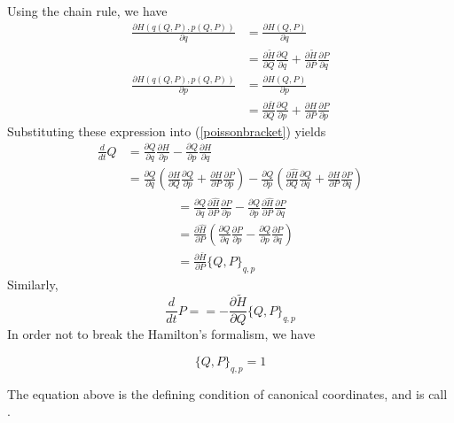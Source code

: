 Using the chain rule, we have
$$
\begin{aligned}
\frac{\partial H(q(Q, P), p(Q, P))}{\partial q} & = \frac{\partial H(Q, P)}{\partial q} \\
&=\frac{\partial \tilde{H}}{\partial Q} \frac{\partial Q}{\partial q}+\frac{\partial \tilde{H}}{\partial P} \frac{\partial P}{\partial q}
\end{aligned}
$$
$$
\begin{aligned}
\frac{\partial H(q(Q, P), p(Q, P))}{\partial p} & = \frac{\partial H(Q, P)}{\partial p} \\
&=\frac{\partial \bar{H}}{\partial Q} \frac{\partial Q}{\partial p}+\frac{\partial H}{\partial P} \frac{\partial P}{\partial p}
\end{aligned}
$$
Substituting these expression into (\ref{poissonbracket}) yields
$$
\begin{aligned}
\frac{d}{d t} Q &=\frac{\partial Q}{\partial q} \frac{\partial H}{\partial p}-\frac{\partial Q}{\partial p} \frac{\partial H}{\partial q} \\
&=\frac{\partial Q}{\partial q}\left(\frac{\partial H}{\partial Q} \frac{\partial Q}{\partial p}+\frac{\partial H}{\partial P} \frac{\partial P}{\partial p}\right)-\frac{\partial Q}{\partial p}\left(\frac{\partial \hat{H}}{\partial Q} \frac{\partial Q}{\partial q}+\frac{\partial H}{\partial P} \frac{\partial P}{\partial q}\right)
\end{aligned}
$$
$$
\begin{aligned}
&=\frac{\partial Q}{\partial q} \frac{\partial \hat{H}}{\partial P} \frac{\partial P}{\partial p}-\frac{\partial Q}{\partial p} \frac{\partial \hat{H}}{\partial P} \frac{\partial P}{\partial q}\\
&=\frac{\partial \hat{H}}{\partial P}\left(\frac{\partial Q}{\partial q} \frac{\partial P}{\partial p}-\frac{\partial Q}{\partial p} \frac{\partial P}{\partial q}\right)\\
&=\frac{\partial \bar{H}}{\partial P}\{Q, P\}_{q, p}
\end{aligned}
$$
Similarly,
$$
\frac{d}{d t} P==-\frac{\partial \tilde{H}}{\partial Q}\{Q, P\}_{q, p}
$$
In order not to break the Hamilton's formalism, we have
\begin{qt}
    \begin{equation}
\{Q, P\}_{q, p}=1
\end{equation}
\end{qt}
The equation above is the defining condition of canonical coordinates, and is call .

